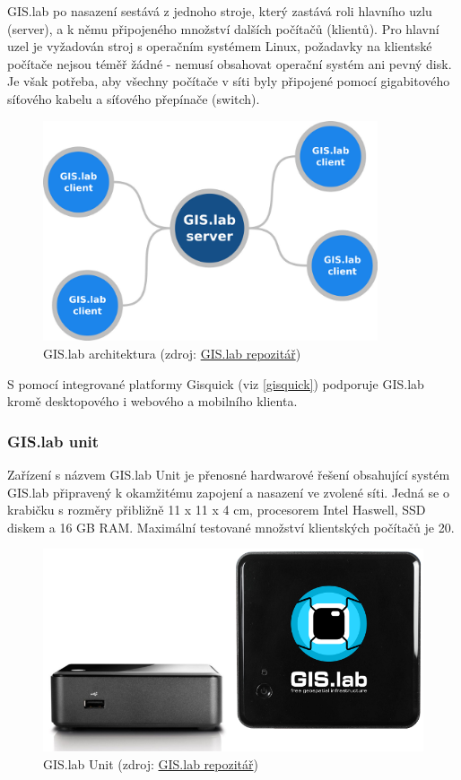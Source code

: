 GIS.lab po nasazení sestává z jednoho stroje, který zastává roli
hlavního uzlu (server), a k němu připojeného množství dalších počítačů
(klientů). Pro hlavní uzel je vyžadován stroj s operačním systémem
Linux, požadavky na klientské počítače nejsou téměř žádné - nemusí
obsahovat operační systém ani pevný disk. Je však potřeba, aby všechny
počítače v síti byly připojené pomocí gigabitového síťového kabelu a
síťového přepínače (switch).

\begin{figure}[H] \centering
    \includegraphics[width=280pt]{./pictures/gislab-architecture.png}
    \caption[GIS.lab architektura]{GIS.lab architektura (zdroj:
	\href{https://github.com/gislab-npo/gislab-doc/blob/master/img/general/gislab-architecture.png}{GIS.lab repozitář})}
	\label{fig:gislab-architecture}
\end{figure}

S pomocí integrované platformy Gisquick (viz \ref{gisquick}) podporuje
GIS.lab kromě desktopového i webového a mobilního klienta.

\subsubsection{GIS.lab unit}
\label{gislab-unit}
Zařízení s názvem GIS.lab Unit je přenosné hardwarové řešení
obsahující systém GIS.lab připravený k okamžitému zapojení a nasazení
ve zvolené síti. Jedná se o krabičku s rozměry přibližně 11 x 11 x 4
cm, procesorem Intel Haswell, SSD diskem a 16 GB RAM. Maximální
testované množství klientských počítačů je 20.

\begin{figure}[H] \centering
    \includegraphics[width=350pt]{./pictures/gislab-unit.png}
    \caption[GIS.lab Unit]{GIS.lab Unit (zdroj:
	\href{https://github.com/gislab-npo/gislab-doc/blob/master/img/general/gislab-unit.svg}{GIS.lab repozitář})}
    \label{fig:gislab-unit}
\end{figure}

